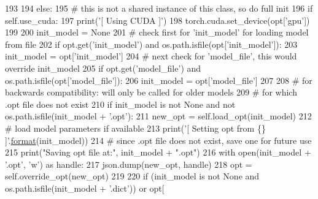 \begin{DoxyCode}
193 
194         \textcolor{keywordflow}{else}:
195             \textcolor{comment}{# this is not a shared instance of this class, so do full init}
196             \textcolor{keywordflow}{if} self.use\_cuda:
197                 print(\textcolor{stringliteral}{'[ Using CUDA ]'})
198                 torch.cuda.set\_device(opt[\textcolor{stringliteral}{'gpu'}])
199 
200             init\_model = \textcolor{keywordtype}{None}
201             \textcolor{comment}{# check first for 'init\_model' for loading model from file}
202             \textcolor{keywordflow}{if} opt.get(\textcolor{stringliteral}{'init\_model'}) \textcolor{keywordflow}{and} os.path.isfile(opt[\textcolor{stringliteral}{'init\_model'}]):
203                 init\_model = opt[\textcolor{stringliteral}{'init\_model'}]
204             \textcolor{comment}{# next check for 'model\_file', this would override init\_model}
205             \textcolor{keywordflow}{if} opt.get(\textcolor{stringliteral}{'model\_file'}) \textcolor{keywordflow}{and} os.path.isfile(opt[\textcolor{stringliteral}{'model\_file'}]):
206                 init\_model = opt[\textcolor{stringliteral}{'model\_file'}]
207 
208             \textcolor{comment}{# for backwards compatibility: will only be called for older models}
209             \textcolor{comment}{# for which .opt file does not exist}
210             \textcolor{keywordflow}{if} init\_model \textcolor{keywordflow}{is} \textcolor{keywordflow}{not} \textcolor{keywordtype}{None} \textcolor{keywordflow}{and} \textcolor{keywordflow}{not} os.path.isfile(init\_model + \textcolor{stringliteral}{'.opt'}):
211                 new\_opt = self.load\_opt(init\_model)
212                 \textcolor{comment}{# load model parameters if available}
213                 print(\textcolor{stringliteral}{'[ Setting opt from \{\} ]'}.\hyperlink{namespaceparlai_1_1chat__service_1_1services_1_1messenger_1_1shared__utils_a32e2e2022b824fbaf80c747160b52a76}{format}(init\_model))
214                 \textcolor{comment}{# since .opt file does not exist, save one for future use}
215                 print(\textcolor{stringliteral}{"Saving opt file at:"}, init\_model + \textcolor{stringliteral}{".opt"})
216                 with open(init\_model + \textcolor{stringliteral}{'.opt'}, \textcolor{stringliteral}{'w'}) \textcolor{keyword}{as} handle:
217                     json.dump(new\_opt, handle)
218                 opt = self.override\_opt(new\_opt)
219 
220             \textcolor{keywordflow}{if} (init\_model \textcolor{keywordflow}{is} \textcolor{keywordflow}{not} \textcolor{keywordtype}{None} \textcolor{keywordflow}{and} os.path.isfile(init\_model + \textcolor{stringliteral}{'.dict'})) \textcolor{keywordflow}{or} opt[

\end{DoxyCode}
